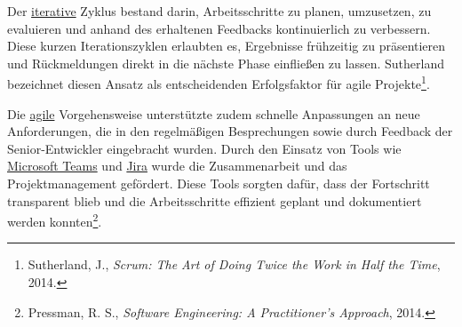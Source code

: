Der \hyperlink{iterativ}{\textcolor{AOBlau}{iterative}} Zyklus bestand darin, Arbeitsschritte zu planen, umzusetzen, zu evaluieren und anhand des erhaltenen Feedbacks kontinuierlich zu verbessern. Diese kurzen Iterationszyklen erlaubten es, Ergebnisse frühzeitig zu präsentieren und Rückmeldungen direkt in die nächste Phase einfließen zu lassen. Sutherland bezeichnet diesen Ansatz als entscheidenden Erfolgsfaktor für agile Projekte\footnote{Sutherland, J., \textit{Scrum: The Art of Doing Twice the Work in Half the Time}, 2014.}.

Die \hyperlink{agil}{\textcolor{AOBlau}{agile}} Vorgehensweise unterstützte zudem schnelle Anpassungen an neue Anforderungen, die in den regelmäßigen Besprechungen sowie durch Feedback der Senior-Entwickler eingebracht wurden. Durch den Einsatz von Tools wie \hyperlink{MicrosoftTeams}{\textcolor{AOBlau}{Microsoft Teams}} und \hyperlink{Jira}{\textcolor{AOBlau}{Jira}} wurde die Zusammenarbeit und das Projektmanagement gefördert. Diese Tools sorgten dafür, dass der Fortschritt transparent blieb und die Arbeitsschritte effizient geplant und dokumentiert werden konnten\footnote{Pressman, R. S., \textit{Software Engineering: A Practitioner's Approach}, 2014.}.
